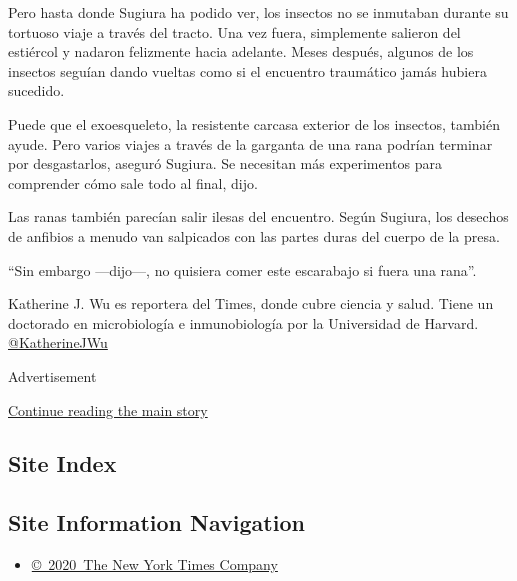 Pero hasta donde Sugiura ha podido ver, los insectos no se inmutaban
durante su tortuoso viaje a través del tracto. Una vez fuera,
simplemente salieron del estiércol y nadaron felizmente hacia adelante.
Meses después, algunos de los insectos seguían dando vueltas como si el
encuentro traumático jamás hubiera sucedido.

Puede que el exoesqueleto, la resistente carcasa exterior de los
insectos, también ayude. Pero varios viajes a través de la garganta de
una rana podrían terminar por desgastarlos, aseguró Sugiura. Se
necesitan más experimentos para comprender cómo sale todo al final,
dijo.

Las ranas también parecían salir ilesas del encuentro. Según Sugiura,
los desechos de anfibios a menudo van salpicados con las partes duras
del cuerpo de la presa.

``Sin embargo ---dijo---, no quisiera comer este escarabajo si fuera una
rana''.

Katherine J. Wu es reportera del Times, donde cubre ciencia y salud.
Tiene un doctorado en microbiología e inmunobiología por la Universidad
de Harvard. \href{https://twitter.com/KatherineJWu}{@KatherineJWu}

Advertisement

\protect\hyperlink{after-bottom}{Continue reading the main story}

\hypertarget{site-index}{%
\subsection{Site Index}\label{site-index}}

\hypertarget{site-information-navigation}{%
\subsection{Site Information
Navigation}\label{site-information-navigation}}

\begin{itemize}
\tightlist
\item
  \href{https://help.nytimes.com/hc/en-us/articles/115014792127-Copyright-notice}{©~2020~The
  New York Times Company}
\end{itemize}

